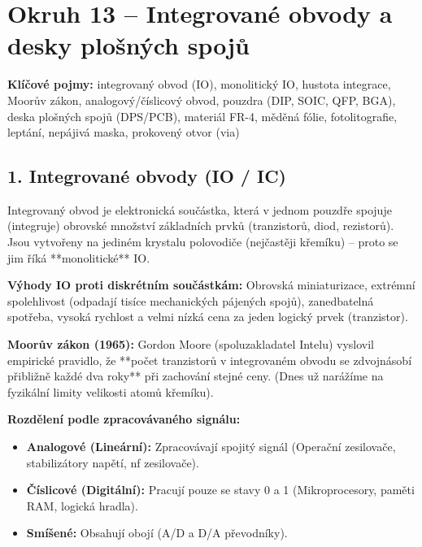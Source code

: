 \documentclass[a4paper,10pt]{article}
\begin{document}
\section*{\large Okruh 13 – Integrované obvody a desky plošných spojů}

\begin{pojmybox}
\textbf{Klíčové pojmy:}
integrovaný obvod (IO), monolitický IO, hustota integrace, Moorův zákon, analogový/číslicový obvod, pouzdra (DIP, SOIC, QFP, BGA), deska plošných spojů (DPS/PCB), materiál FR-4, měděná fólie, fotolitografie, leptání, nepájivá maska, prokovený otvor (via)
\end{pojmybox}

\begin{vysvetlenibox}

\subsection*{1. Integrované obvody (IO / IC)}

Integrovaný obvod je elektronická součástka, která v jednom pouzdře spojuje (integruje) obrovské množství základních prvků (tranzistorů, diod, rezistorů). Jsou vytvořeny na jediném krystalu polovodiče (nejčastěji křemíku) – proto se jim říká **monolitické** IO.

\textbf{Výhody IO proti diskrétním součástkám:}
Obrovská miniaturizace, extrémní spolehlivost (odpadají tisíce mechanických pájených spojů), zanedbatelná spotřeba, vysoká rychlost a velmi nízká cena za jeden logický prvek (tranzistor).

\begin{durazbox}
\textbf{Moorův zákon (1965):} Gordon Moore (spoluzakladatel Intelu) vyslovil empirické pravidlo, že **počet tranzistorů v integrovaném obvodu se zdvojnásobí přibližně každé dva roky** při zachování stejné ceny. (Dnes už narážíme na fyzikální limity velikosti atomů křemíku).
\end{durazbox}

\textbf{Rozdělení podle zpracovávaného signálu:}
\begin{itemize}
    \item \textbf{Analogové (Lineární):} Zpracovávají spojitý signál (Operační zesilovače, stabilizátory napětí, nf zesilovače).
    \item \textbf{Číslicové (Digitální):} Pracují pouze se stavy 0 a 1 (Mikroprocesory, paměti RAM, logická hradla).
    \item \textbf{Smíšené:} Obsahují obojí (A/D a D/A převodníky).
\end{itemize}


\end{vysvetlenibox}
\end{document}
